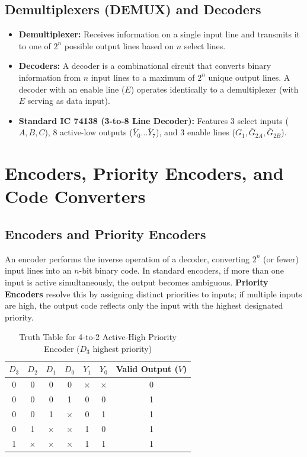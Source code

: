 \subsection{Demultiplexers (DEMUX) and Decoders}
\begin{itemize}
    \item \textbf{Demultiplexer:} Receives information on a single input line and transmits it to one of $2^n$ possible output lines based on $n$ select lines.
    \item \textbf{Decoders:} A decoder is a combinational circuit that converts binary information from $n$ input lines to a maximum of $2^n$ unique output lines. A decoder with an enable line ($E$) operates identically to a demultiplexer (with $E$ serving as data input).
    \item \textbf{Standard IC 74138 (3-to-8 Line Decoder):} Features 3 select inputs ($A, B, C$), 8 active-low outputs ($\overline{Y}_0 \dots \overline{Y}_7$), and 3 enable lines ($G_1, \overline{G}_{2A}, \overline{G}_{2B}$).
\end{itemize}

\section{Encoders, Priority Encoders, and Code Converters}
\subsection{Encoders and Priority Encoders}
An encoder performs the inverse operation of a decoder, converting $2^n$ (or fewer) input lines into an $n$-bit binary code.
In standard encoders, if more than one input is active simultaneously, the output becomes ambiguous.
\textbf{Priority Encoders} resolve this by assigning distinct priorities to inputs; if multiple inputs are high, the output code reflects only the input with the highest designated priority.

\begin{table}[htbp]
\centering
\caption{Truth Table for 4-to-2 Active-High Priority Encoder ($D_3$ highest priority)}
\label{tab:priority-encoder-tt}
\begin{tabularx}{\textwidth}{c c c c c c c}
\toprule
$D_3$ & $D_2$ & $D_1$ & $D_0$ & $Y_1$ & $Y_0$ & \textbf{Valid Output ($V$)} \\
\midrule
0 & 0 & 0 & 0 & $\times$ & $\times$ & 0 \\
0 & 0 & 0 & 1 & 0 & 0 & 1 \\
0 & 0 & 1 & $\times$ & 0 & 1 & 1 \\
0 & 1 & $\times$ & $\times$ & 1 & 0 & 1 \\
1 & $\times$ & $\times$ & $\times$ & 1 & 1 & 1 \\
\bottomrule
\end{tabularx}
\end{table}

